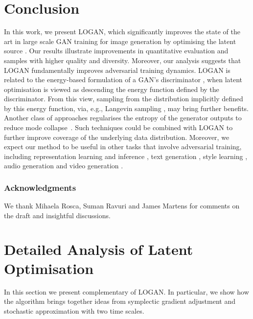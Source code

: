 \documentclass{article} \usepackage{iclr2020_conference,times}
\begin{document}
\section{Conclusion}

In this work, we present LOGAN, which significantly improves the state of the art in large scale GAN training for image generation by optimising the latent source .
Our results illustrate improvements in quantitative evaluation and samples with higher quality and diversity. 
Moreover, our analysis suggests that LOGAN fundamentally improves adversarial training dynamics.
LOGAN is related to the energy-based formulation of a GAN's discriminator \citep{dai2017calibrating,kumar2019maximum,du2019implicit}, when latent optimisation is viewed as descending the energy function defined by the discriminator.
From this view, sampling from the distribution implicitly defined by this energy function, via, e.g., Langevin sampling \citep{welling2011bayesian}, may bring further benefits.
Another class of approaches regularises the entropy of the generator outputs to reduce mode collapse~\citep{mine,presgan}.
Such techniques could be combined with LOGAN to further improve coverage of the underlying data distribution.
Moreover, we expect our method to be useful in other tasks that involve adversarial training, including representation learning and inference \citep{donahue2016adversarial,ali,bigbigan}, text generation \citep{zhang2019self}, style learning \citep{zhu2017unpaired,karras2019style}, audio generation \citep{donahue2018adversarial} and video generation \citep{vondrick2016generating,clark2019efficient}.

\subsubsection*{Acknowledgments}
We thank Mihaela Rosca, Suman Ravuri and James Martens for comments on the draft and insightful discussions.







\appendix

\section{Detailed Analysis of Latent Optimisation}
\label{app:analysis}
In this section we present complementary of LOGAN. In particular, we show how the algorithm brings together ideas from symplectic gradient adjustment and stochastic approximation with two time scales. 
\end{document}
